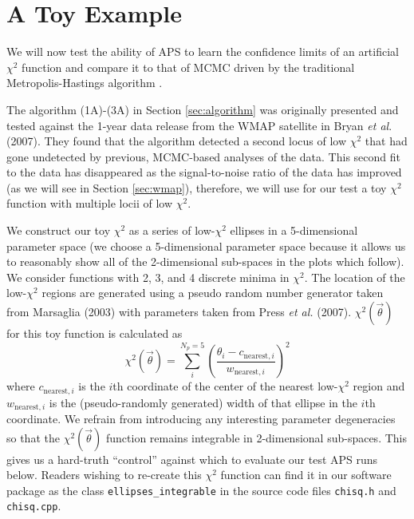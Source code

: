 \documentclass[useAMS,usenatbib]{aastex}
\begin{document}
\section{A Toy Example}
\label{sec:toy}

We will now test the ability of APS to learn the confidence limits of an
artificial $\chi^2$ function and compare it to that of MCMC driven by the
traditional Metropolis-Hastings algorithm \cite{mcmc,cosmomc}.

The algorithm (1A)-(3A) in Section \ref{sec:algorithm} 
was originally presented and tested against the 1-year data
release from the WMAP satellite in Bryan {\it et al}. (2007).  They found that
the algorithm detected a second locus of low $\chi^2$
that had gone undetected by previous, MCMC-based analyses of the data.  
This second fit to the data has disappeared as the signal-to-noise
ratio of the data has improved (as we will see in Section \ref{sec:wmap}),
therefore, we will use for our test a toy $\chi^2$ function
with multiple locii of low $\chi^2$.  

We construct our toy $\chi^2$ as a series of low-$\chi^2$ ellipses in a 5-dimensional
parameter space (we choose a 5-dimensional parameter space because it allows us to
reasonably show all of the 2-dimensional sub-spaces in the plots which follow).
We consider functions with 2, 3, and 4 discrete minima in $\chi^2$.
The location of the low-$\chi^2$ regions are generated using a pseudo random number
generator taken from Marsaglia (2003) with parameters taken from Press {\it et al.} (2007).
$\chi^2(\vec{\theta})$ for this toy function is calculated as 
\begin{equation}
\label{eqn:toychi}
\chi^2(\vec{\theta})=
\sum_i^{N_p=5}\left(\frac{\theta_i-c_{\text{nearest},i}}{w_{\text{nearest},i}}\right)^2
\end{equation}
where $c_{\text{nearest},i}$ is the $i$th coordinate of the center of the nearest low-$\chi^2$
region and $w_{\text{nearest},i}$ is the (pseudo-randomly generated) width of that ellipse in
the $i$th coordinate.  We refrain from introducing any interesting parameter degeneracies so
that the $\chi^2(\vec{\theta})$ function remains integrable in 2-dimensional sub-spaces.
This gives us a hard-truth ``control'' against which to evaluate our test APS runs below.
Readers wishing to re-create this $\chi^2$ function can find it in our software
package as the class \verb|ellipses_integrable| in the source code files \verb|chisq.h| and
\verb|chisq.cpp|.
\end{document}
